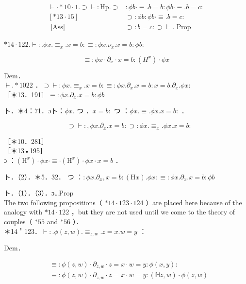 \documentclass[10pt]{article}
\begin{document}
$$
\begin{array}{ll}
\vdash \cdot * 10 \cdot 1 . \supset \vdash: \mathrm{Hp} . \supset & : \phi b \cdot \equiv . b=b: \phi b \cdot \equiv . b=c: \\
{[* 13 \cdot 15]} & \supset: \phi b: \phi b \cdot \equiv . b=c: \\
\text { [Ass] } & \supset: b=c: \supset \vdash . \text { Prop }
\end{array}
$$

$* 14 \cdot 122 . \vdash: . \phi x . \equiv_{x} . x=b: \equiv: \phi x . \nu_{x} . x=b: \phi b:$

$$
\equiv: \phi x \cdot \partial_{x} \cdot x=b:\left(H^{x}\right) \cdot \phi x
$$

Dem．\\
$\vdash . * 1022$ ．$\supset \vdash: \phi x . \equiv_{x} . x=b: \equiv: \phi x . \partial_{x} . x=b: x=b . \partial_{x} . \phi x:$\\
［＊13．191］$\equiv: \phi x . \partial_{x} . x=b: \phi b$

ト．＊4：71．ɔト：$\phi x$. つ ．$x=b:$ つ ：$\phi x . \equiv . \phi x . x=b:$ ．


\begin{equation*}
[* 10 \cdot 11 \cdot 27] \quad \supset \vdash:, \phi x . \partial_{x} . x=b: \supset: \phi x . \equiv_{x} . \phi x . x=b: \tag{1}
\end{equation*}


［＊10．281］\\
［＊13•195］\\
ɔ ：$\left(\mathrm{H}^{x}\right) \cdot \phi x \cdot \equiv \cdot\left(\mathrm{H}^{x}\right) \cdot \phi x \cdot x=b$ ．

ト．（2）．＊5．32． つ ：$: \phi x . \partial_{x}, x=b:(\mathrm{H} x) . \phi x: \equiv: \phi x . \partial_{x} . x=b: \phi b$

ト．（1）．（3）．ɔ…Prop\\
The two following propositions（ $* 14 \cdot 123 \cdot 124$ ）are placed here because of the analogy with $* 14 \cdot 122$ ，but they are not used until we come to the theory of couples（ $* 55$ and $* 56$ ）．\\
＊14＇123．$\vdash: . \phi(z, w) . \equiv_{z, w} . z=x . w=y$ ：

Dem．

$$
\begin{aligned}
& \equiv: \phi(z, w) \cdot \partial_{z, w} \cdot z=x \cdot w=y: \phi(x, y): \\
& \equiv: \phi(z, w) \cdot \partial_{z, w} \cdot z=x \cdot w=y:(\mathbb{H} z, w) \cdot \phi(z, w)
\end{aligned}
$$
\end{document}
